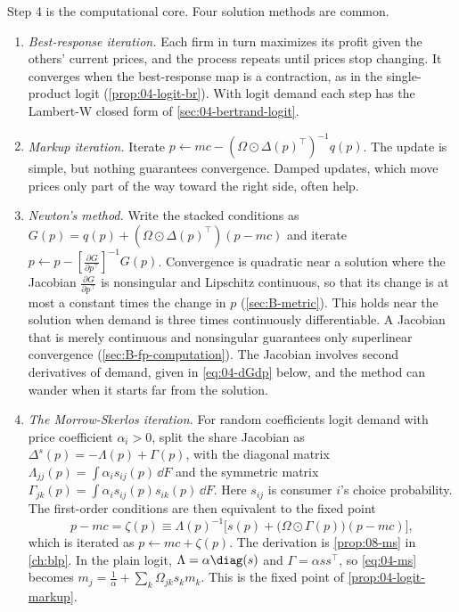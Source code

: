Step 4 is the computational core. Four solution methods are common.
\begin{enumerate}
  \item \emph{Best-response iteration.} Each firm in turn maximizes its profit given the others' current prices,
  and the process repeats until prices stop changing. It converges when the best-response map is a contraction, as
  in the single-product logit (\cref{prop:04-logit-br}). With logit demand each step has the Lambert-W closed form
  of \cref{sec:04-bertrand-logit}.
  \item \emph{Markup iteration.} Iterate $p \leftarrow mc - (\Omega \odot \Delta(p)^\top)^{-1}q(p)$. The update is
  simple, but nothing guarantees convergence. Damped updates, which move prices only part of the way toward the
  right side, often help.
  \item \emph{Newton's method.} Write the stacked conditions as $G(p) = q(p) + (\Omega \odot \Delta(p)^\top)(p -
  mc)$ and iterate $p \leftarrow p - [\frac{\partial G}{\partial p^\top}]^{-1}G(p)$. Convergence is quadratic near
  a solution where the Jacobian $\frac{\partial G}{\partial p^\top}$ is nonsingular and Lipschitz continuous, so that
  its change is at most a constant times the change in $p$ (\cref{sec:B-metric}). This holds near the solution when
  demand is three times continuously differentiable. A Jacobian that is merely continuous and nonsingular guarantees
  only superlinear convergence (\cref{sec:B-fp-computation}). The Jacobian involves second derivatives of demand, given in \eqref{eq:04-dGdp} below, and the
  method can wander when it starts far from the solution.
  \item \emph{The Morrow-Skerlos iteration.} For random coefficients logit demand with price coefficient $\alpha_i > 0$,
  split the share Jacobian as $\Delta^s(p) = -\Lambda(p) + \Gamma(p)$, with the diagonal matrix
  $\Lambda_{jj}(p) = \int\alpha_i s_{ij}(p)\,\dd F$ and the symmetric matrix $\Gamma_{jk}(p) = \int\alpha_i
  s_{ij}(p)s_{ik}(p)\,\dd F$. Here $s_{ij}$ is consumer $i$'s choice probability. The first-order conditions are
  then equivalent to the fixed point \citep{MorrowSkerlos2011}
  \begin{equation}\label{eq:04-ms}
  p - mc = \zeta(p) \equiv \Lambda(p)^{-1}\Big[s(p) + \big(\Omega \odot \Gamma(p)\big)(p - mc)\Big],
  \end{equation}
  which is iterated as $p \leftarrow mc + \zeta(p)$. The derivation is \cref{prop:08-ms} in \cref{ch:blp}. In the
  plain logit, $\Lambda = \alpha\diag(s)$ and $\Gamma = \alpha ss^\top$, so \eqref{eq:04-ms} becomes $m_j =
  \frac{1}{\alpha} + \sum_k\Omega_{jk}s_k m_k$. This is the fixed point of \cref{prop:04-logit-markup}.
\end{enumerate}

